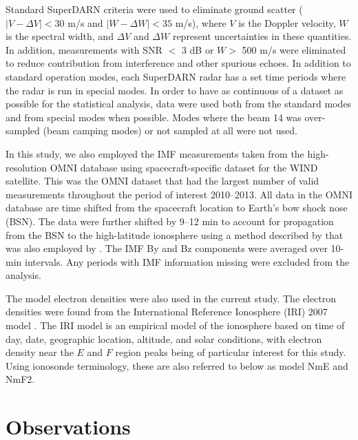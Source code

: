 Standard SuperDARN criteria were used to eliminate ground scatter (\(\left| V-\Delta V \right| <30\) m/s and \(\left| W-\Delta W \right| <35\) m/s), where \(V\) is the Doppler velocity, \(W\) is the spectral width, and \(\Delta V\) and \(\Delta W\) represent uncertainties in these quantities. In addition, measurements with SNR \(<\) 3 dB or \(W>\) 500 m/s were eliminated to reduce contribution from interference and other spurious echoes. In addition to standard operation modes, each SuperDARN radar has a set time periods where the radar is run in special modes. In order to have as continuous of a dataset as possible for the statistical analysis, data were used both from the standard modes and from special modes when possible. Modes where the beam 14 was over-sampled (beam camping modes) or not sampled at all were not used.

In this study, we also employed the IMF measurements taken from the high-resolution OMNI database using spacecraft-specific dataset for the WIND satellite. This was the OMNI dataset that had the largest number of valid measurements throughout the period of interest 2010--2013. All data in the OMNI database are time shifted from the spacecraft location to Earth's bow shock nose (BSN). The data were further shifted by 9--12 min to account for propagation from the BSN to the high-latitude ionosphere using a method described by \citet{Khan1999} that was also employed by \citet{Makarevich2012}. The IMF By and Bz components were averaged over 10-min intervals. Any periods with IMF information missing were excluded from the analysis.

The model electron densities were also used in the current study. The electron densities were found from the International Reference Ionosphere (IRI) 2007 model \citep{Bilitza2008}. The IRI model is an empirical model of the ionosphere based on time of day, date, geographic location, altitude, and solar conditions, with electron density near the \(E\) and \(F\) region peaks being of particular interest for this study.  Using ionosonde terminology, these are also referred to below as model NmE and NmF2.



\section{Observations}
\label{Sec:Obs}

